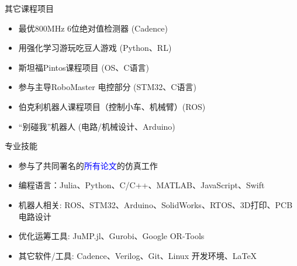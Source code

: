 \documentclass{resume} %
\begin{document}
\begin{rSection}{其它课程项目}
    \begin{multicols}{2} 
    \begin{itemize}
        \item 最优800MHz 6位绝对值检测器 (Cadence)
        \item 用强化学习游玩吃豆人游戏 (Python、RL) 
        \item 斯坦福Pintos课程项目 (OS、C语言)
        \item 参与主导RoboMaster 电控部分 (STM32、C语言)
        \item 伯克利机器人课程项目（控制小车、机械臂）(ROS) %
        \item ``别碰我''机器人 (电路/机械设计、Arduino)
    \end{itemize}
    \end{multicols}  %
    \vspace{-5mm}
\end{rSection}

\begin{rSection}{专业技能}
    \begin{itemize}
        \item 参与了共同署名的\textcolor{blue}{所有论文}的仿真工作
        \item 编程语言：Julia、Python、C/C++、MATLAB、JavaScript、Swift
        \item 机器人相关: ROS、STM32、Arduino、SolidWorks、RTOS、3D打印、PCB电路设计
        \item 优化运筹工具: JuMP.jl、Gurobi、Google OR-Tools
        \item 其它软件/工具: Cadence、Verilog、Git、Linux 开发环境、LaTeX
    \end{itemize} 
\end{rSection}



\end{document}
